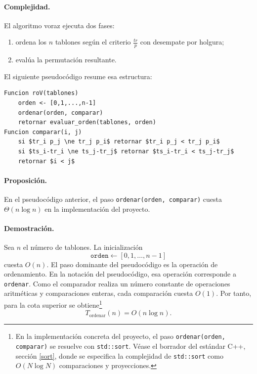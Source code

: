 \documentclass[12pt,a4paper]{article}
\begin{document}
\paragraph{Complejidad.}
El algoritmo voraz ejecuta dos fases:
\begin{enumerate}
  \item ordena los \(n\) tablones seg\'un el criterio \(\frac{tr}{p}\) con desempate por holgura;
  \item eval\'ua la permutaci\'on resultante.
\end{enumerate}

El siguiente pseudoc\'odigo resume esa estructura:

\begin{center}
\begin{minipage}{0.88\textwidth}
\begin{lstlisting}[mathescape=true,basicstyle=\ttfamily\normalsize\linespread{1.12}\selectfont,aboveskip=0.8em,belowskip=0.8em]
Funcion roV(tablones)
    orden <- [0,1,...,n-1]
    ordenar(orden, comparar)
    retornar evaluar_orden(tablones, orden)
Funcion comparar(i, j)
    si $tr_i p_j \ne tr_j p_i$ retornar $tr_i p_j < tr_j p_i$
    si $ts_i-tr_i \ne ts_j-tr_j$ retornar $ts_i-tr_i < ts_j-tr_j$
    retornar $i < j$
\end{lstlisting}
\end{minipage}
\end{center}

\paragraph{Proposici\'on.}
En el pseudoc\'odigo anterior, el paso \texttt{ordenar(orden, comparar)} cuesta \(\Theta(n\log n)\) en la implementaci\'on del proyecto.

\paragraph{Demostraci\'on.}
Sea \(n\) el n\'umero de tablones. La inicializaci\'on
\[
\texttt{orden} \leftarrow [0,1,\dots,n-1]
\]
cuesta \(O(n)\). El paso dominante del pseudoc\'odigo es la operaci\'on de ordenamiento. En la notaci\'on del pseudoc\'odigo, esa operaci\'on corresponde a \texttt{ordenar}. Como el comparador realiza un n\'umero constante de operaciones aritm\'eticas y comparaciones enteras, cada comparaci\'on cuesta \(O(1)\). Por tanto, para la cota superior se obtiene\footnote{En la implementaci\'on concreta del proyecto, el paso \texttt{ordenar(orden, comparar)} se resuelve con \texttt{std::sort}. V\'ease el borrador del est\'andar C++, secci\'on \href{https://eel.is/c++draft/sort}{[sort]}, donde se especifica la complejidad de \texttt{std::sort} como \(O(N\log N)\) comparaciones y proyecciones.}
\[
T_{\text{ordenar}}(n)=O(n\log n).
\]
\end{document}

